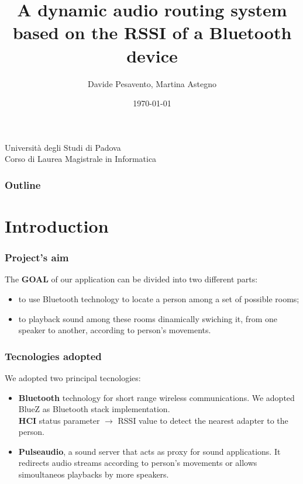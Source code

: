 \documentclass{beamer}
\title{A dynamic audio routing system\\based on the RSSI of a Bluetooth device}
\author{Davide Pesavento, Martina Astegno}
\date{\today}
\begin{document}
\begin{frame}[plain]
\titlepage
	\begin{center}
		Universit\`{a} degli Studi di Padova \\
		Corso di Laurea Magistrale in Informatica
	\end{center}
\end{frame} 
 
\begin{frame}
	\frametitle{Outline}
	\tableofcontents 
\end{frame}


\section{Introduction}

	\begin{frame}
		\frametitle{Project's aim}
		The \textbf{GOAL} of our application can be divided into two different parts: 
		\pause
		\begin{itemize}
		\item to use Bluetooth technology to locate a person among a set of possible rooms;
		\pause
		\item to playback sound among these rooms dinamically swiching it, from one speaker to another, according to person's movements. 
		\end{itemize}    
	\end{frame}
	
	\begin{frame}
		\frametitle{Tecnologies adopted}
		We adopted two principal tecnologies:
		\pause
		\begin{itemize}
		\item \textbf{Bluetooth} technology for short range wireless communications. We adopted BlueZ as Bluetooth stack implementation.\\ \textbf{HCI} status parameter $\rightarrow$ RSSI value to detect the nearest adapter to the person. 
		\pause
		\item \textbf{Pulseaudio}, a sound server that acts as proxy for sound applications. It redirects audio streams according to person's movements or allows simoultaneos playbacks by more speakers. 
		
		\end{itemize}
	\end{frame}
	
\end{document}
